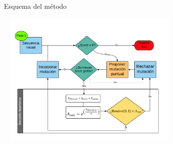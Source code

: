 \documentclass{beamer}
\begin{document}




\begin{frame}[plain]{Esquema del método}
\vspace{-1.0\baselineskip}
\begin{adjustwidth}{-2.0em}{-2.0em}
\includegraphics[width=350px,height=250px]{../img/patenaSpanish.png} 
\end{adjustwidth}
\end{frame}
\end{document}
